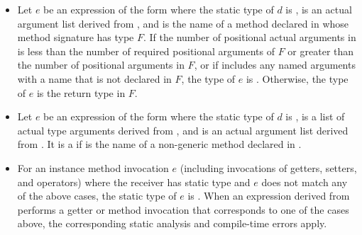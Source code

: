 \documentclass[makeidx]{article}
\begin{document}
{\begin{itemize}
\item
  Let $e$ be an expression of the form 
  where the static type of $d$ is \DYNAMIC,  is
  an actual argument list derived from ,
  and \id{} is the name of a method declared in 
  whose method signature has type $F$.
  If the number of positional actual arguments in 
  is less than the number of required positional arguments of $F$
  or greater than the number of positional arguments in $F$,
  or if  includes any named arguments
  with a name that is not declared in $F$,
  the type of $e$ is \DYNAMIC.
  Otherwise, the type of $e$ is the return type in $F$.

\item
  Let $e$ be an expression of the form
   where
  the static type of $d$ is \DYNAMIC,
   is a list of actual
  type arguments derived from , and
   is an actual argument list derived from .
  It is a  if \id{} is the name of
  a non-generic method declared in .

\item
  For an instance method invocation $e$ (including invocations of getters,
  setters, and operators) where the receiver has static type \DYNAMIC{} and
  $e$ does not match any of the above cases, the static type of $e$ is
  \DYNAMIC.
  When an expression derived from  performs
  a getter or method invocation that corresponds to one of the cases above,
  the corresponding static analysis and compile-time errors apply.
\end{itemize}

}
\end{document}
